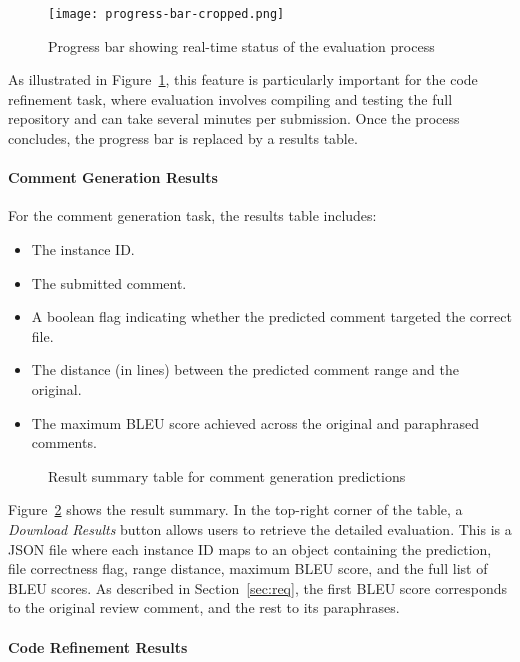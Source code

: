 \begin{figure}[H]
	\centering
	\texttt{[image: progress-bar-cropped.png]}
	\caption{Progress bar showing real-time status of the evaluation process}
	\label{fig:progress-bar}
\end{figure}


As illustrated in Figure~\ref{fig:progress-bar}, this feature is particularly important for the code
refinement task, where evaluation involves compiling and testing the full repository and can take
several minutes per submission. Once the process concludes, the progress bar is replaced by a
results table.

\paragraph{Comment Generation Results}

For the comment generation task, the results table includes:
\begin{itemize}
	\item The instance ID.
	\item The submitted comment.
	\item A boolean flag indicating whether the predicted comment targeted the correct file.
	\item The distance (in lines) between the predicted comment range and the original.
	\item The maximum BLEU score achieved across the original and paraphrased comments.
\end{itemize}

\begin{figure}[H]
	\centering
	\caption{Result summary table for comment generation predictions}
	\label{fig:comment-table}
\end{figure}

Figure~\ref{fig:comment-table} shows the result summary. In the top-right corner of the table, a
\textit{Download Results} button allows users to retrieve the detailed evaluation. This is a JSON
file where each instance ID maps to an object containing the prediction, file correctness flag,
range distance, maximum BLEU score, and the full list of BLEU scores. As described in
Section~\ref{sec:req}, the first BLEU score corresponds to the original review comment, and the rest
to its paraphrases.

\paragraph{Code Refinement Results}

